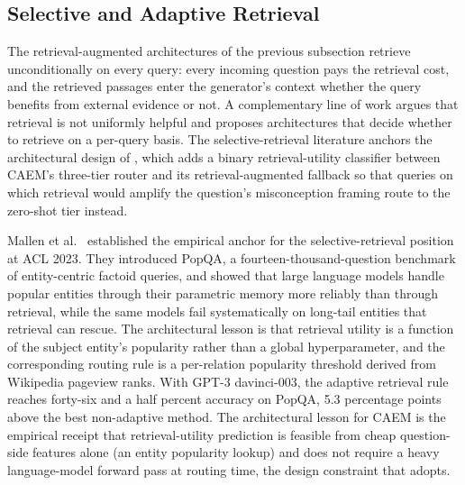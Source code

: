 \subsection{Selective and Adaptive Retrieval}
\label{sec:lit-selective-retrieval}

The retrieval-augmented architectures of the previous subsection retrieve unconditionally on every query: every incoming question pays the retrieval cost, and the retrieved passages enter the generator's context whether the query benefits from external evidence or not. A complementary line of work argues that retrieval is not uniformly helpful and proposes architectures that decide whether to retrieve on a per-query basis. The selective-retrieval literature anchors the architectural design of , which adds a binary retrieval-utility classifier between CAEM's three-tier router and its retrieval-augmented fallback so that queries on which retrieval would amplify the question's misconception framing route to the zero-shot tier instead.

Mallen et al.~\cite{mallen2023whennot} established the empirical anchor for the selective-retrieval position at ACL 2023. They introduced PopQA, a fourteen-thousand-question benchmark of entity-centric factoid queries, and showed that large language models handle popular entities through their parametric memory more reliably than through retrieval, while the same models fail systematically on long-tail entities that retrieval can rescue. The architectural lesson is that retrieval utility is a function of the subject entity's popularity rather than a global hyperparameter, and the corresponding routing rule is a per-relation popularity threshold derived from Wikipedia pageview ranks. With GPT-3 davinci-003, the adaptive retrieval rule reaches forty-six and a half percent accuracy on PopQA, 5.3 percentage points above the best non-adaptive method. The architectural lesson for CAEM is the empirical receipt that retrieval-utility prediction is feasible from cheap question-side features alone (an entity popularity lookup) and does not require a heavy language-model forward pass at routing time, the design constraint that  adopts.

